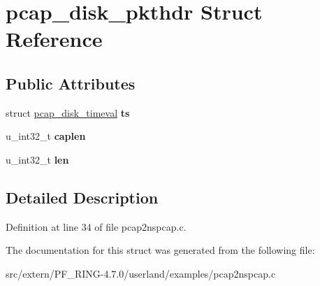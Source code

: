 \hypertarget{structpcap__disk__pkthdr}{
\section{pcap\_\-disk\_\-pkthdr Struct Reference}
\label{structpcap__disk__pkthdr}
}
\subsection*{Public Attributes}
\begin{DoxyCompactItemize}
\item 
\hypertarget{structpcap__disk__pkthdr_a3112efecf03d678298fbbbcabe16d674}{
struct \hyperlink{structpcap__disk__timeval}{pcap\_\-disk\_\-timeval} {\bfseries ts}}
\label{structpcap__disk__pkthdr_a3112efecf03d678298fbbbcabe16d674}

\item 
\hypertarget{structpcap__disk__pkthdr_a1d85926d61e39de8a997651bf7a9dfa9}{
u\_\-int32\_\-t {\bfseries caplen}}
\label{structpcap__disk__pkthdr_a1d85926d61e39de8a997651bf7a9dfa9}

\item 
\hypertarget{structpcap__disk__pkthdr_af729564a0bc598c494b3392e3cf46963}{
u\_\-int32\_\-t {\bfseries len}}
\label{structpcap__disk__pkthdr_af729564a0bc598c494b3392e3cf46963}

\end{DoxyCompactItemize}


\subsection{Detailed Description}


Definition at line 34 of file pcap2nspcap.c.



The documentation for this struct was generated from the following file:\begin{DoxyCompactItemize}
\item 
src/extern/PF\_\-RING-\/4.7.0/userland/examples/pcap2nspcap.c\end{DoxyCompactItemize}
